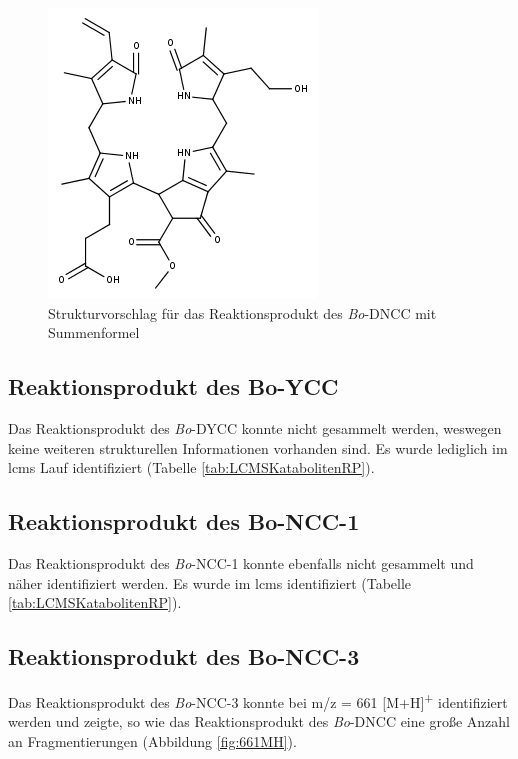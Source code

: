 \begin{figure}[!htbp]
  \centering
  \includegraphics[scale=0.6]{figures/Kapitel7/Kataboliten/fragmentation_structures/VWA_Katabolit_633.png}
  \caption[Strukturvorschlag für das Reaktionsprodukt des \textit{Bo}-DNCC, Quelle: Autor]{Strukturvorschlag für das Reaktionsprodukt des \textit{Bo}-DNCC mit Summenformel }
  \label{fig:633MStruktur}
\end{figure}

\pagebreak
\subsection{Reaktionsprodukt des Bo-YCC}

Das Reaktionsprodukt des \textit{Bo}-DYCC konnte nicht gesammelt werden, weswegen keine weiteren strukturellen Informationen vorhanden sind. Es wurde lediglich im \gls{lcms} Lauf identifiziert (Tabelle \ref{tab:LCMSKatabolitenRP}).

\subsection{Reaktionsprodukt des Bo-NCC-1}

Das Reaktionsprodukt des \textit{Bo}-NCC-1 konnte ebenfalls nicht gesammelt und näher identifiziert werden. Es wurde im \gls{lcms} identifiziert (Tabelle \ref{tab:LCMSKatabolitenRP}).

\pagebreak
\subsection{Reaktionsprodukt des Bo-NCC-3} \label{sec:ESIMSRPBoNCC3}

Das Reaktionsprodukt des \textit{Bo}-NCC-3 konnte bei m/z = 661 [M+H]\textsuperscript{+} identifiziert werden und zeigte, so wie das Reaktionsprodukt des \textit{Bo}-DNCC eine große Anzahl an Fragmentierungen (Abbildung \ref{fig:661MH}). 

